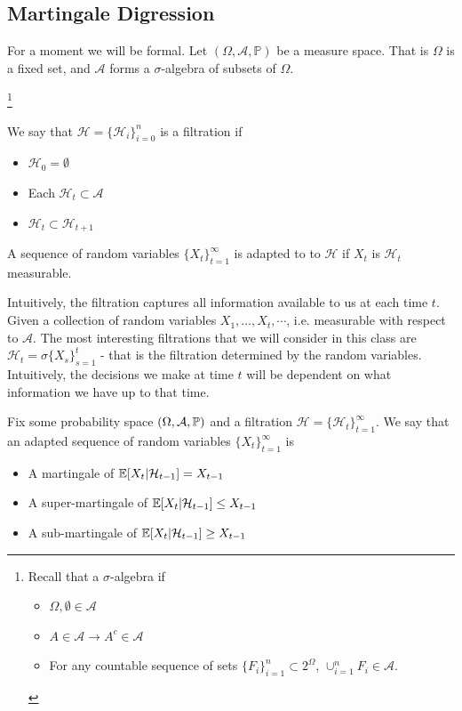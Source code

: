 
\subsection{Martingale Digression}

For a moment we will be formal. Let $(\Omega, \mathcal{A}, \mathbb{P})$ be a measure space. That is $\Omega$ is a fixed set, and $\mathcal{A}$ forms a $\sigma$-algebra of subsets of $\Omega$.

\footnote{Recall that a $\sigma$-algebra if \begin{itemize}\item $\Omega, \emptyset\in \mathcal{A}$ \item $A\in \mathcal{A} \rightarrow A^c\in \mathcal{A}$ \item For any countable sequence of sets $\{F_i\}_{i=1}^n\subset 2^{\Omega}$, $\cup_{i=1}^n F_i\in \mathcal{A}$. \end{itemize}}

\begin{definition}
We say that $\mathcal{H} = \{\mathcal{H}_i\}_{i=0}^n$ is a filtration if 
\begin{itemize}
    \item $\mathcal{H}_0 = \emptyset $
    \item Each $\mathcal{H}_t\subset \mathcal{A}$
    \item $\mathcal{H}_t\subset \mathcal{H}_{t+1}$
\end{itemize}

A sequence of random variables $\{X_t\}_{t=1}^{\infty}$ is adapted to to $\mathcal{H}$ if $X_t$ is $\mathcal{H}_t$ measurable. 
\end{definition}
Intuitively, the filtration captures all information available to us at each time $t$. Given a collection of random variables $X_1, \dots, X_t, \cdots$, i.e. measurable with respect to $\mathcal{A}$. The most interesting filtrations that we will consider in this class are $\mathcal{H}_t = \sigma\{X_{s}\}_{s=1}^t$ - that is the filtration determined by the random variables. Intuitively, the decisions we make at time $t$ will be dependent on what information we have up to that time. 

\begin{definition}
    Fix some probability space $(\Omega, \mathcal{A}, \mathbb{P})$ and a filtration $\mathcal{H} = \{\mathcal{H}_t\}_{t=1}^{\infty}$. We say that an adapted sequence of random variables $\{X_t\}_{t=1}^{\infty}$ is 
    \begin{itemize}
        \item A martingale of $\mathbb{E}[X_{t}|\mathcal{H}_{t-1}] = X_{t-1}$
        \item A super-martingale of $\mathbb{E}[X_{t}|\mathcal{H}_{t-1}] \leq X_{t-1}$
        \item A sub-martingale of $\mathbb{E}[X_{t}|\mathcal{H}_{t-1}] \geq X_{t-1}$
    \end{itemize}    
\end{definition}


